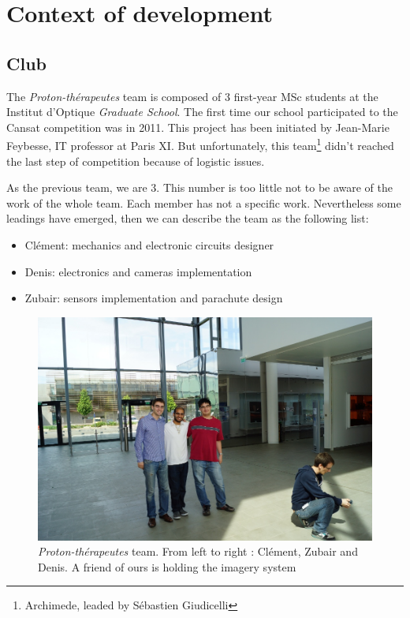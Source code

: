 \documentclass[twocolumn,10pt]{article}
\begin{document}
\section{Context of development}%
    \subsection{Club}%
    \par The \textit{Proton-thérapeutes} team is composed of 3 first-year MSc students at the Institut d'Optique \textit{Graduate School}. The first time our school participated to the Cansat competition was in 2011. This project has been initiated by Jean-Marie Feybesse, IT professor at Paris XI. But unfortunately, this team\footnote{Archimede, leaded by Sébastien Giudicelli} didn't reached the last step of competition because of logistic issues.
    \par As the previous team, we are 3. This number is too little not to be aware of the work of the whole team. Each member has not a specific work. Nevertheless some leadings have emerged, then we can describe the team as the following list:
    \begin{itemize}
        \item Clément: mechanics and electronic circuits designer
        \item Denis: electronics and cameras implementation
        \item Zubair: sensors implementation and parachute design
    \end{itemize}
\begin{figure}[!h]
\includegraphics[scale=.25]{equipe.jpg}
\caption{\textit{Proton-thérapeutes} team. From left to right : Clément, Zubair and Denis. A friend of ours is holding the imagery system}
\end{figure}
\end{document}
